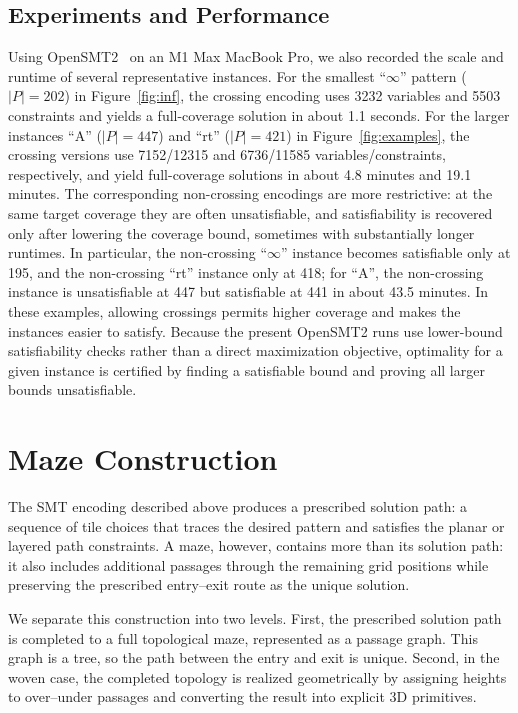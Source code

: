 \documentclass[acmsmall,screen,nonacm]{acmart}
\begin{document}
\subsection{Experiments and Performance}

Using OpenSMT2~\cite{OpenSMT2} on an M1 Max MacBook Pro, we also
recorded the scale and runtime of several representative
instances. For the smallest ``$\infty$'' pattern ($|P|=202$) in
Figure~\ref{fig:inf}, the crossing encoding uses 3232 variables and
5503 constraints and yields a full-coverage solution in about 1.1
seconds. For the larger instances ``A'' ($|P|=447$) and ``rt''
($|P|=421$) in Figure~\ref{fig:examples}, the crossing versions use
7152/12315 and 6736/11585 variables/constraints, respectively, and
yield full-coverage solutions in about 4.8 minutes and 19.1
minutes. The corresponding non-crossing encodings are more
restrictive: at the same target coverage they are often unsatisfiable,
and satisfiability is recovered only after lowering the coverage
bound, sometimes with substantially longer runtimes. In particular,
the non-crossing ``$\infty$'' instance becomes satisfiable only at
195, and the non-crossing ``rt'' instance only at 418; for ``A'', the
non-crossing instance is unsatisfiable at 447 but satisfiable at 441
in about 43.5 minutes. In these examples, allowing crossings permits
higher coverage and makes the instances easier to satisfy. Because the
present OpenSMT2 runs use lower-bound satisfiability checks rather than
a direct maximization objective, optimality for a given instance is
certified by finding a satisfiable bound and proving all larger bounds
unsatisfiable.

\section{Maze Construction}

The SMT encoding described above produces a prescribed solution path:
a sequence of tile choices that traces the desired pattern and
satisfies the planar or layered path constraints. A maze, however,
contains more than its solution path: it also includes additional
passages through the remaining grid positions while preserving the
prescribed entry--exit route as the unique solution.

We separate this construction into two levels. First, the prescribed
solution path is completed to a full topological maze, represented as
a passage graph. This graph is a tree, so the path between the entry
and exit is unique. Second, in the woven case, the completed topology
is realized geometrically by assigning heights to over--under passages
and converting the result into explicit 3D primitives.
\end{document}
